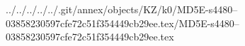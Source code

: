 ../../../../../.git/annex/objects/KZ/k0/MD5E-s4480--03858230597cfe72c51f354449cb29ee.tex/MD5E-s4480--03858230597cfe72c51f354449cb29ee.tex
